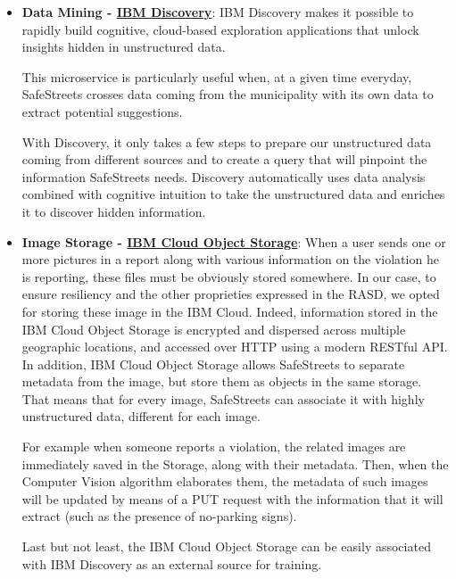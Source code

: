 \begin{itemize}
	\item \textbf{Data Mining - \href{https://cloud.ibm.com/catalog/services/discovery}{IBM Discovery}}: \hypertarget{discovery}{} IBM Discovery makes it possible to rapidly build cognitive, cloud-based exploration applications that unlock insights hidden in unstructured data. 
	
	This microservice is particularly useful when, at a given time everyday, SafeStreets crosses data coming from the municipality with its own data to extract potential suggestions.
	
	With Discovery, it only takes a few steps to prepare our unstructured data coming from different sources and to create a query that will pinpoint the information SafeStreets needs. Discovery automatically uses data analysis combined with cognitive intuition to take the unstructured data and enriches it to discover hidden information.
	
	\item \textbf{Image Storage - \href{https://cloud.ibm.com/catalog/services/cloud-object-storage}{IBM Cloud Object Storage}}: \hypertarget{cloudObjectStorage}{} When a user sends one or more pictures in a report along with various information on the violation he is reporting, these files must be obviously stored somewhere. In our case, to ensure resiliency and the other proprieties expressed in the RASD, we opted for storing these image in the IBM Cloud. Indeed, information stored in the IBM Cloud Object Storage is encrypted and dispersed across multiple geographic locations, and accessed over HTTP using a modern RESTful API.
	In addition, IBM Cloud Object Storage allows SafeStreets to separate metadata from the image, but store them as objects in the same storage. That means that for every image, SafeStreets can associate it with highly unstructured data, different for each image. 
	
	For example when someone reports a violation, the related images are immediately saved in the Storage, along with their metadata. Then, when the Computer Vision algorithm elaborates them, the metadata of such images will be updated by means of a PUT request with the information that it will extract (such as the presence of no-parking signs).
	
	Last but not least, the IBM Cloud Object Storage can be easily associated with IBM Discovery as an external source for training.
	

\end{itemize}
